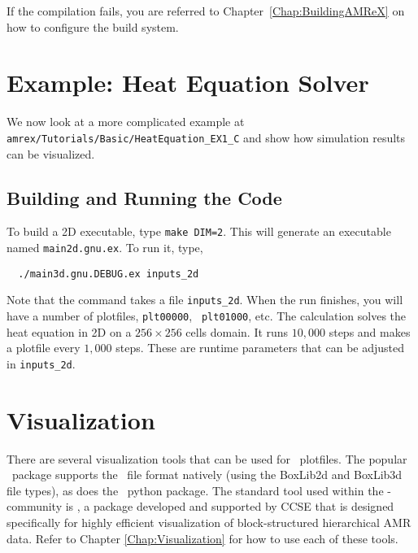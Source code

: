 If the compilation fails, you are referred to
Chapter~\ref{Chap:BuildingAMReX} on how to configure the build
system.

\section{Example: Heat Equation Solver}\label{sec:heat equation}

We now look at a more complicated example at {\tt
  amrex/Tutorials/Basic/HeatEquation\_EX1\_C} and show how simulation
results can be visualized.

\subsection{Building and Running the Code}

To build a 2D executable, type {\tt make DIM=2}.  This will generate
an executable named {\tt main2d.gnu.ex}.  To run it, type,
\begin{verbatim}
  ./main3d.gnu.DEBUG.ex inputs_2d
\end{verbatim}
Note that the command takes a file {\tt inputs\_2d}.  When the run
finishes, you will have a number of plotfiles, {\tt plt00000}, {\tt
  plt01000}, etc.  The calculation solves the heat equation in 2D on a
$256 \times 256$ cells domain.  It runs $10,000$ steps and makes a
plotfile every $1,000$ steps.  These are runtime parameters that can
be adjusted in {\tt inputs\_2d}.

\section{Visualization}

There are several visualization tools that can be used for \amrex\
plotfiles.  The popular \visit\ package supports the \amrex\ file 
format natively (using the {\sf BoxLib2d} and {\sf BoxLib3d} file types),
as does the \yt\ python package.  The standard tool used within the
\amrex-community is \amrvis, a package developed and supported 
by CCSE that is designed specifically for highly efficient visualization
of block-structured hierarchical AMR data.  Refer to 
Chapter \ref{Chap:Visualization} for how to use each of these tools.
